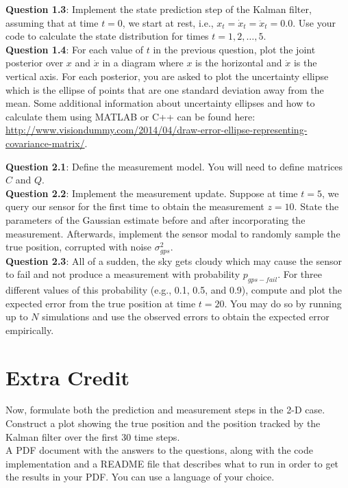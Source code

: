 \documentclass{article}
\begin{document}
{\bf Question 1.3}: Implement the state prediction step of the Kalman filter, assuming that at time $t = 0$, we start at rest, i.e., $x_t = \dot{x}_t = \ddot{x}_t = 0.0$. Use your code to calculate the state distribution for times $t = 1, 2, \ldots, 5$.\\

{\bf Question 1.4}: For each value of $t$ in the previous question, plot the joint posterior over $x$ and $\dot{x}$ in a diagram where $x$ is the horizontal and $\dot{x}$ is the vertical axis. For each posterior, you are asked to plot the uncertainty ellipse which is the ellipse of points that are one standard deviation away from the mean. Some additional information about uncertainty ellipses and how to calculate them using MATLAB or C++ can be found here: \url{http://www.visiondummy.com/2014/04/draw-error-ellipse-representing-covariance-matrix/}.

{\bf Question 2.1}: Define the measurement model. You will need to define matrices $C$ and $Q$. \\

{\bf Question 2.2}: Implement the measurement update. Suppose at time $t = 5$, we query our sensor for the first time to obtain the measurement $z = 10$. State the parameters of the Gaussian estimate before and after incorporating the measurement. Afterwards, implement the sensor modal to randomly sample the true position, corrupted with noise $\sigma_{gps}^2$. \\

{\bf Question 2.3}: All of a sudden, the sky gets cloudy which may cause the sensor to fail and not produce a measurement with probability $p_{gps-fail}$. For three different values of this probability (e.g., 0.1, 0.5, and 0.9), compute and plot the expected error from the true position at time $t = 20$. You may do so by running up to $N$ simulations and use the observed errors to obtain the expected error empirically.  

\section{Extra Credit}

Now, formulate both the prediction and measurement steps in the 2-D case. Construct a plot showing the true position and the position tracked by the Kalman filter over the first 30 time steps. \\

 A PDF document with the answers to the questions, along with the code implementation and a README file that describes what to run in order to get the results in your PDF. You can use a language of your choice. 


%
%
\end{document}
